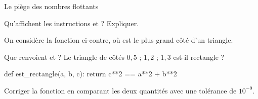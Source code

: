 \begin{exercice}[3]{Le piège des nombres flottants}
\begin{questions}
  \item Qu'affichent les instructions  et  ? Expliquer.
  \item On considère la fonction  ci-contre, où  est le plus grand côté d'un triangle.
\begin{codecote}[0.48]
\raggedright
Que renvoient  et  ? Le triangle de côtés $0{,}5$ ; $1{,}2$ ;
$1{,}3$ est-il rectangle ?
\cote
\begin{pythoncol}
def est_rectangle(a, b, c):
    return c**2 == a**2 + b**2
\end{pythoncol}
\end{codecote}
  \item Corriger la fonction en comparant les deux quantités avec une tolérance de $10^{-9}$.
\end{questions}
\end{exercice}

